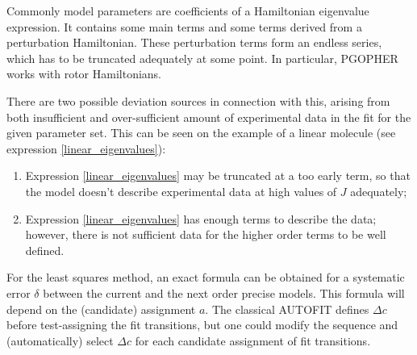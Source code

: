 \documentclass[11pt]{article}
\begin{document}
Commonly  model parameters are coefficients of a Hamiltonian eigenvalue expression. It contains some main terms and some terms derived from a perturbation Hamiltonian. These perturbation terms form an endless series, which has to be truncated adequately at some point. In particular, PGOPHER works with rotor Hamiltonians. 

There are two possible deviation sources in connection with this, arising from both insufficient and over-sufficient amount of experimental data in the fit for the given parameter set. This can be seen on the example of a linear molecule (see expression \ref{linear_eigenvalues}):
\begin{enumerate}
	\item Expression \ref{linear_eigenvalues} may be truncated at a too early term, so that the model doesn't describe experimental data at high values of $J$ adequately;
	\item Expression \ref{linear_eigenvalues} has enough terms to describe the data; however, there is not sufficient data for the higher order terms to be well defined. 
\end{enumerate}

For the least squares method, an exact formula can be obtained for a systematic error $\delta$ between the current and the next order precise models. This formula will depend on the (candidate) assignment $a$. The classical AUTOFIT defines $\Delta c$ before test-assigning the fit transitions, but one could modify the sequence and (automatically) select $\Delta c$ for each candidate assignment of fit transitions.  


\end{document}
